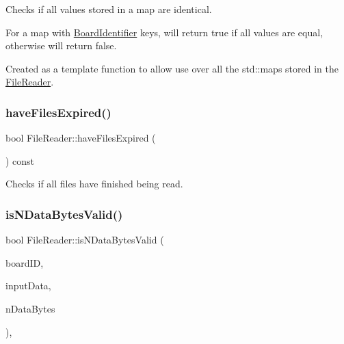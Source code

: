 Checks if all values stored in a map are identical. 

For a map with \hyperlink{class_board_identifier}{Board\+Identifier} keys, will return true if all values are equal, otherwise will return false.

Created as a template function to allow use over all the std\+::maps stored in the \hyperlink{class_file_reader}{File\+Reader}. \mbox{\label{class_file_reader_a58b80f2c9c2ec8381527bdfca1008007}} 
\subsubsection{\texorpdfstring{have\+Files\+Expired()}{haveFilesExpired()}}
{\footnotesize\ttfamily bool File\+Reader\+::have\+Files\+Expired (\begin{DoxyParamCaption}{ }\end{DoxyParamCaption}) const\hspace{0.3cm}{\ttfamily [inline]}}



Checks if all files have finished being read. 

\mbox{\label{class_file_reader_ae0a796cb06ebe3e486795dea8da0f6bc}} 
\subsubsection{\texorpdfstring{is\+N\+Data\+Bytes\+Valid()}{isNDataBytesValid()}}
{\footnotesize\ttfamily bool File\+Reader\+::is\+N\+Data\+Bytes\+Valid (\begin{DoxyParamCaption}\item[{const \hyperlink{class_board_identifier}{Board\+Identifier} \&}]{board\+ID,  }\item[{std\+::unique\+\_\+ptr$<$ std\+::ifstream $>$ \&}]{input\+Data,  }\item[{const unsigned int}]{n\+Data\+Bytes }\end{DoxyParamCaption})\hspace{0.3cm}{\ttfamily [inline]}, {\ttfamily [private]}}



